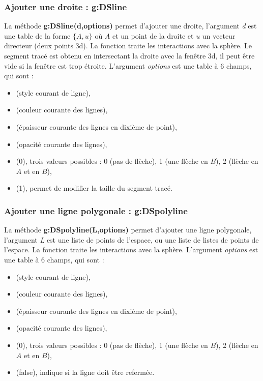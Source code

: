 \subsubsection{ Ajouter une droite : g:DSline}

La méthode \textbf{g:DSline(d,options)} permet d'ajouter une droite, l'argument \emph{d} est une table de la forme $\{A,u\}$ où $A$ et un point de la droite et $u$ un vecteur directeur (deux points 3d). La fonction traite les interactions avec la sphère.  Le segment tracé est obtenu en intersectant la droite avec la fenêtre 3d, il peut être vide si la fenêtre est trop étroite. L'argument \emph{options} est une table à 6 champs, qui sont :
    \begin{itemize}
        \item {} (style courant de ligne), 
        \item {} (couleur courante des lignes),
        \item {} (épaisseur courante des lignes en dixième de point),
        \item {} (opacité courante des lignes),
        \item {} (0), trois valeurs possibles : 0 (pas de flèche), 1 (une flèche en $B$), 2 (flèche en $A$ et en $B$),
        \item {} (1), permet de modifier la taille du segment tracé.
    \end{itemize}
    
\subsubsection{ Ajouter une ligne polygonale : g:DSpolyline}

La méthode \textbf{g:DSpolyline(L,options)} permet d'ajouter une ligne polygonale, l'argument \emph{L} est une liste de points de l'espace, ou une liste de listes de points de l'espace. La fonction traite les interactions avec la sphère. L'argument \emph{options} est une table à 6 champs, qui sont :
    \begin{itemize}
        \item {} (style courant de ligne), 
        \item {} (couleur courante des lignes),
        \item {} (épaisseur courante des lignes en dixième de point),
        \item {} (opacité courante des lignes),
        \item {} (0), trois valeurs possibles : 0 (pas de flèche), 1 (une flèche en $B$), 2 (flèche en $A$ et en $B$),
        \item {} (false), indique si la ligne doit être refermée.
    \end{itemize}    

